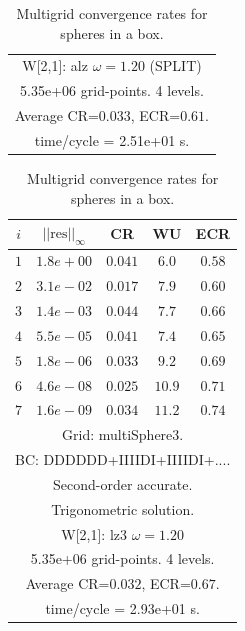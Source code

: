 \begin{table}[hbt]
\begin{center}
{\begin{tabular}{|c|c|c|c|c|}
\multicolumn{5}{|c|}{W[2,1]: alz $\omega=1.20$ (SPLIT)}  \\
\multicolumn{5}{|c|}{5.35e+06 grid-points. 4 levels.}  \\
\multicolumn{5}{|c|}{Average CR=$0.033$, ECR=$0.61$.}  \\
\multicolumn{5}{|c|}{time/cycle = 2.51e+01 s.}  \\
\hline 
\end{tabular}
\begin{tabular}{|c|c|c|c|c|} \hline 
 $i$   & $\vert\vert\mbox{res}\vert\vert_\infty$  &  CR     &  WU    & ECR  \\   \hline 
 $ 1$  & $ 1.8e+00$ & $0.041$ & $ 6.0$ & $0.58$ \\ 
 $ 2$  & $ 3.1e-02$ & $0.017$ & $ 7.9$ & $0.60$ \\ 
 $ 3$  & $ 1.4e-03$ & $0.044$ & $ 7.7$ & $0.66$ \\ 
 $ 4$  & $ 5.5e-05$ & $0.041$ & $ 7.4$ & $0.65$ \\ 
 $ 5$  & $ 1.8e-06$ & $0.033$ & $ 9.2$ & $0.69$ \\ 
 $ 6$  & $ 4.6e-08$ & $0.025$ & $10.9$ & $0.71$ \\ 
 $ 7$  & $ 1.6e-09$ & $0.034$ & $11.2$ & $0.74$ \\ 
\hline 
\multicolumn{5}{|c|}{Grid: multiSphere3.}  \\
\multicolumn{5}{|c|}{BC: DDDDDD+IIIIDI+IIIIDI+....}  \\
\multicolumn{5}{|c|}{Second-order accurate.}  \\
\multicolumn{5}{|c|}{Trigonometric solution.}  \\
\multicolumn{5}{|c|}{W[2,1]: lz3 $\omega=1.20$}  \\
\multicolumn{5}{|c|}{5.35e+06 grid-points. 4 levels.}  \\
\multicolumn{5}{|c|}{Average CR=$0.032$, ECR=$0.67$.}  \\
\multicolumn{5}{|c|}{time/cycle = 2.93e+01 s.}  \\
\hline 
\end{tabular}
} %
\end{center}
\caption{Multigrid convergence rates for spheres in a box.}
\label{fig:multiSphereI}
\end{table}



